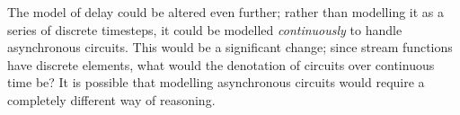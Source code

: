 The model of delay could be altered even further; rather than modelling
it as a series of discrete timesteps, it could be modelled \emph{continuously}
to handle asynchronous circuits.
This would be a significant change; since stream
functions have discrete elements, what would the denotation of circuits over
continuous time be?
It is possible that modelling asynchronous circuits would require a completely
different way of reasoning.